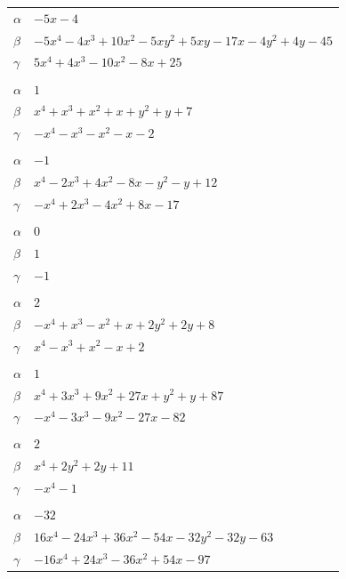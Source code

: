 \documentclass[11pt]{article}
\begin{document}
\begin{longtable}{@{}ll@{}}
$\alpha$ & $-5x-4$\\
$\beta$ & $-5x^{4}-4x^{3}+10x^{2}-5xy^{2}+5xy-17x-4y^{2}+4y-45$\\
$\gamma$ & $5x^{4}+4x^{3}-10x^{2}-8x+25$\\
\addlinespace[3pt]
\multicolumn{2}{@{}l}{$\{i,j\}=\{4,5\}$, $k_{ij}=2^{3}$}\\
$\alpha$ & $1$\\
$\beta$ & $x^{4}+x^{3}+x^{2}+x+y^{2}+y+7$\\
$\gamma$ & $-x^{4}-x^{3}-x^{2}-x-2$\\
\addlinespace[3pt]
\multicolumn{2}{@{}l}{$\{i,j\}=\{4,7\}$, $k_{ij}=2^{2}\cdot 7$}\\
$\alpha$ & $-1$\\
$\beta$ & $x^{4}-2x^{3}+4x^{2}-8x-y^{2}-y+12$\\
$\gamma$ & $-x^{4}+2x^{3}-4x^{2}+8x-17$\\
\addlinespace[3pt]
\multicolumn{2}{@{}l}{$\{i,j\}=\{4,9\}$, $k_{ij}=3$}\\
$\alpha$ & $0$\\
$\beta$ & $1$\\
$\gamma$ & $-1$\\
\addlinespace[3pt]
\multicolumn{2}{@{}l}{$\{i,j\}=\{4,11\}$, $k_{ij}=2^{3}$}\\
$\alpha$ & $2$\\
$\beta$ & $-x^{4}+x^{3}-x^{2}+x+2y^{2}+2y+8$\\
$\gamma$ & $x^{4}-x^{3}+x^{2}-x+2$\\
\addlinespace[3pt]
\multicolumn{2}{@{}l}{$\{i,j\}=\{4,15\}$, $k_{ij}=2^{2}\cdot 3^{2}\cdot 7$}\\
$\alpha$ & $1$\\
$\beta$ & $x^{4}+3x^{3}+9x^{2}+27x+y^{2}+y+87$\\
$\gamma$ & $-x^{4}-3x^{3}-9x^{2}-27x-82$\\
\addlinespace[3pt]
\multicolumn{2}{@{}l}{$\{i,j\}=\{4,18\}$, $k_{ij}=2^{2}\cdot 3$}\\
$\alpha$ & $2$\\
$\beta$ & $x^{4}+2y^{2}+2y+11$\\
$\gamma$ & $-x^{4}-1$\\
\addlinespace[3pt]
\multicolumn{2}{@{}l}{$\{i,j\}=\{4,19\}$, $k_{ij}=3^{2}\cdot 11$}\\
$\alpha$ & $-32$\\
$\beta$ & $16x^{4}-24x^{3}+36x^{2}-54x-32y^{2}-32y-63$\\
$\gamma$ & $-16x^{4}+24x^{3}-36x^{2}+54x-97$\\

\end{longtable}
\end{document}

